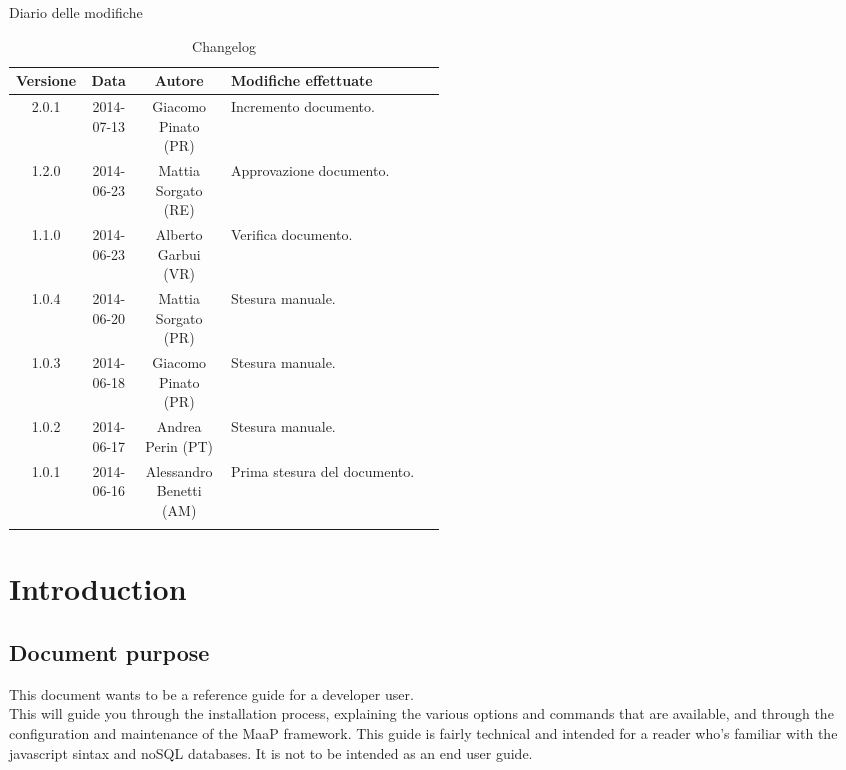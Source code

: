 
\newpage
Diario delle modifiche
\begin{center}
\begin{longtable}{|c|c|c|p{0.5\linewidth}|}
\toprule
\textbf{Versione} & \textbf{Data} & \textbf{Autore} & \textbf{Modifiche effettuate}\\

\midrule
2.0.1 & 2014-07-13 & Giacomo Pinato (PR) & Incremento documento.\\
\midrule
1.2.0 & 2014-06-23 & Mattia Sorgato (RE) & Approvazione documento.\\
\midrule
1.1.0 & 2014-06-23 & Alberto Garbui (VR) & Verifica documento.\\
\midrule
1.0.4 & 2014-06-20 & Mattia Sorgato (PR) & Stesura manuale.\\
\midrule
1.0.3 & 2014-06-18 & Giacomo Pinato (PR) & Stesura manuale.\\
\midrule
1.0.2 & 2014-06-17 & Andrea Perin (PT) & Stesura manuale.\\
\midrule
1.0.1 & 2014-06-16 & Alessandro Benetti (AM) & Prima stesura del documento.\\

\bottomrule
\caption{Changelog}
\label{tab:changelog}

\end{longtable}
\end{center}

\newpage
\tableofcontents

\newpage

\newpage
\section{Introduction}
\subsection{Document purpose}
This document wants to be a reference guide for a developer user. \\
This will guide you through the installation process, explaining the various options and commands that are available, and through the configuration and maintenance of the MaaP framework.
This guide is fairly technical and intended for a reader who's familiar with the javascript sintax and noSQL databases.
It is not to be intended as an end user guide.

